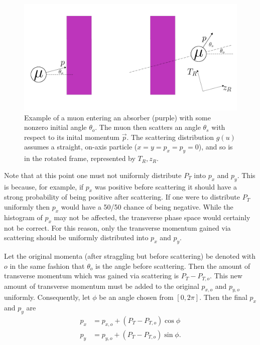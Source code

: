 \begin{figure}
  \centering
    \includegraphics[width=\textwidth]{Figures/cosyRotatedFrame} 
  \caption{Example of a muon entering an absorber (purple) with some nonzero initial angle $\theta_o$. The muon then scatters an angle $\theta_s$ with respect to its inital momentum $\vec{p}$. The scattering distribution $g(u)$ assumes a straight, on-axis particle ($x=y=p_x=p_y=0$), and so is in the rotated frame, represented by $T_R, z_R$.}
  \label{fig:cosyRotatedFrame}
\end{figure}

Note that at this point one must not uniformly distribute $P_T$ into $p_x$ and $p_y$. This is because, for example, if $p_x$ was positive before scattering it should have a strong probability of being positive after scattering. If one were to distribute $P_T$ uniformly then $p_x$ would have a 50/50 chance of being negative. While the histogram of $p_x$ may not be affected, the transverse phase space would certainly not be correct. For this reason, only the transverse momentum gained via scattering should be uniformly distributed into $p_x$ and $p_y$.

Let the original momenta (after straggling but before scattering) be denoted with $o$ in the same fashion that $\theta_o$ is the angle before scattering. Then the amount of transverse momentum which was gained via scattering is $P_T-P_{T,o}$. This new amount of transverse momentum must be added to the original $p_{x,o}$ and $p_{y,o}$ uniformly. Consequently, let $\phi$ be an angle chosen from $[0,2\pi]$. Then the final $p_x$ and $p_y$ are
\begin{align*}
p_x&=p_{x,o}+(P_T-P_{T,o})\cos\phi\\
p_y&=p_{y,o}+(P_T-P_{T,o})\sin\phi.
\end{align*}

